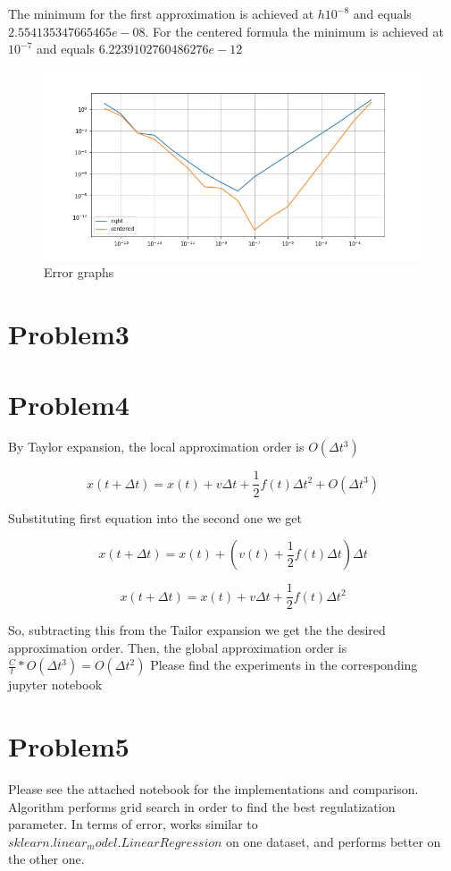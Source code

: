 \documentclass{article}
\begin{document}
The minimum for the first approximation is achieved at $h10^{-8}$ and equals $2.554135347665465e-08$. For the centered formula the minimum is achieved at $10^{-7}$ and equals $6.2239102760486276e-12$

\begin{figure}[h!]
\centering
\includegraphics[scale=0.5]{errorplot.png}
\caption{Error graphs}
\label{fig:error_graph}
\end{figure}


\section{Problem3}



\section{Problem4}
By Taylor expansion, the local approximation order is $O(\Delta{t}^3)$

\[
x(t + \Delta{t}) = x(t) + v\Delta{t} + \frac{1}{2}f(t)\Delta{t}^2 + O(\Delta{t}^3) 
\]

Substituting first equation into the second one we get

\[
x(t + \Delta{t}) = x(t) + (v(t) + \frac{1}{2}f(t)\Delta{t})\Delta{t}
\]

\[
x(t+ \Delta{t}) = x(t) + v\Delta{t} + \frac{1}{2}f(t)\Delta{t}^2
\]

So, subtracting this from the Tailor expansion we get the the desired approximation order.
Then, the global approximation order is $\frac{C}{t} * O(\Delta{t}^3) = O(\Delta{t}^2)$
Please find the experiments in the corresponding jupyter notebook



\section{Problem5}
Please see the attached notebook for the implementations and comparison. Algorithm performs grid search in order to find the best regulatization parameter. In terms of error, works similar to $sklearn.linear_model.LinearRegression$ on one dataset, and performs better on the other one.

% 
% 
\end{document}
